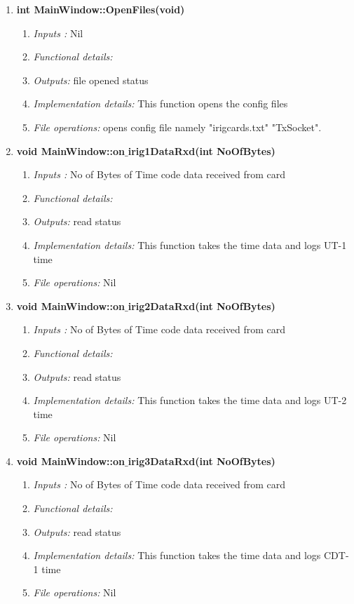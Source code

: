 \begin{enumerate}
	\item  \textbf{int MainWindow::OpenFiles(void)}
	\begin{enumerate}
		\item \textit{Inputs :} Nil 
		\item \textit{Functional details:} 
		\item \textit{Outputs:} file opened status
		\item \textit{Implementation details:}  This function opens the config files
		\item \textit{File operations:} opens config file namely "irigcards.txt" "TxSocket".
	\end{enumerate}
	
	\item  \textbf{void MainWindow::on$\_$irig1DataRxd(int NoOfBytes)}
	\begin{enumerate}
		\item \textit{Inputs :} No of Bytes of Time code data received from card
		\item \textit{Functional details:} 
		\item \textit{Outputs:} read status 
		\item \textit{Implementation details:} This function takes the time data and logs UT-1 time
		\item \textit{File operations:} Nil
	\end{enumerate}
	
	\item  \textbf{void MainWindow::on$\_$irig2DataRxd(int NoOfBytes)}
	\begin{enumerate}
		\item \textit{Inputs :} No of Bytes of Time code data received from card
		\item \textit{Functional details:} 
		\item \textit{Outputs:} read status 
		\item \textit{Implementation details:} This function takes the time data and logs UT-2 time
		\item \textit{File operations:} Nil
	\end{enumerate}
	
	\item  \textbf{void MainWindow::on$\_$irig3DataRxd(int NoOfBytes)}
	\begin{enumerate}
		\item \textit{Inputs :} No of Bytes of Time code data received from card
		\item \textit{Functional details:} 
		\item \textit{Outputs:} read status 
		\item \textit{Implementation details:} This function takes the time data and logs CDT-1 time
		\item \textit{File operations:} Nil
	\end{enumerate}
	

\end{enumerate}
